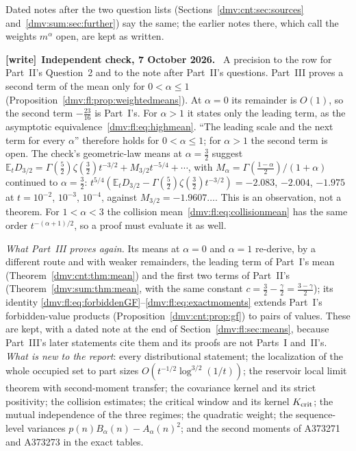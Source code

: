 \documentclass[11pt,letterpaper]{article}
\numberwithin{equation}{section}
\theoremstyle{definition}\newtheorem{definition}[theorem]{Definition}
\theoremstyle{remark}\newtheorem{remark}[theorem]{Remark}
\newcommand{\E}{\mathbb E}
\newenvironment{writenote}[1][]{\par\smallskip\begingroup\small
 \noindent\textbf{[write]}\if\relax\detokenize{#1}\relax\else~\textbf{#1.}\fi\ }%
 {\par\endgroup\smallskip}
\begin{document}
Dated notes after the two question lists (Sections~\ref{dmv:cnt:sec:sources}
and~\ref{dmv:sum:sec:further}) say the same; the earlier notes there,
which call the weights $m^\alpha$ open, are kept as written.
\begin{writenote}[Independent check, 7 October 2026]
A precision to the row for Part~II's Question~2 and to the note after
Part~II's questions. Part~III proves a second term of the mean only for
$0<\alpha\le1$ (Proposition~\ref{dmv:fl:prop:weightedmeans}). At $\alpha=0$
its remainder is $O(1)$, so the second term $-\tfrac{23}{16}$ is Part~I's.
For $\alpha>1$ it states only the leading term, as the asymptotic
equivalence~\eqref{dmv:fl:eq:highmean}. ``The leading scale and the next
term for every $\alpha$'' therefore holds for $0<\alpha\le1$; for
$\alpha>1$ the second term is open. The check's geometric-law means at
$\alpha=\tfrac32$ suggest
$\E_tD_{3/2}=\Gamma(\tfrac52)\zeta(\tfrac32)t^{-3/2}+M_{3/2}t^{-5/4}+\cdots$,
with $M_\alpha=\Gamma(\frac{1-\alpha}2)/(1+\alpha)$ continued to
$\alpha=\tfrac32$: $t^{5/4}(\E_tD_{3/2}-\Gamma(\tfrac52)\zeta(\tfrac32)t^{-3/2})
=-2.083$, $-2.004$, $-1.975$ at $t=10^{-2}$, $10^{-3}$, $10^{-4}$, against
$M_{3/2}=-1.9607\ldots$. This is an observation, not a theorem. For
$1<\alpha<3$ the collision mean~\eqref{dmv:fl:eq:collisionmean} has the same
order $t^{-(\alpha+1)/2}$, so a proof must evaluate it as well.
\end{writenote}

\emph{What Part~III proves again.} Its means at $\alpha=0$ and $\alpha=1$
re-derive, by a different route and with weaker remainders, the leading
term of Part~I's mean (Theorem~\ref{dmv:cnt:thm:mean}) and the first two
terms of Part~II's (Theorem~\ref{dmv:sum:thm:mean}, with the same constant
$c=\tfrac32-\tfrac\gamma2=\tfrac{3-\gamma}2$); its identity
\eqref{dmv:fl:eq:forbiddenGF}--\eqref{dmv:fl:eq:exactmoments} extends
Part~I's forbidden-value products (Proposition~\ref{dmv:cnt:prop:gf}) to
pairs of values. These are kept, with a dated note at the end of
Section~\ref{dmv:fl:sec:means}, because Part~III's later statements cite
them and its proofs are not Parts~I and~II's. \emph{What is new to the
report}: every distributional statement; the localization of the whole
occupied set to part sizes $O(t^{-1/2}\log^{3/2}(1/t))$; the reservoir
local limit theorem with second-moment transfer; the covariance kernel and
its strict positivity; the collision estimates; the critical window and
its kernel $K_{\rm crit}$; the mutual independence of the three regimes;
the quadratic weight; the sequence-level variances
$p(n)B_\alpha(n)-A_\alpha(n)^2$; and the second moments of A373271 and
A373273 in the exact tables.
\end{document}
